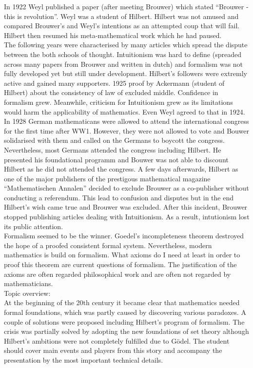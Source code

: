 \documentclass[hidelinks]{article}
\theoremstyle{plain}
\theoremstyle{definition}
\theoremstyle{rem}
\begin{document}
In 1922 Weyl published a paper (after meeting Brouwer) which stated ``Brouwer - this is revolution''. Weyl was a student of Hilbert. Hilbert was not amused and compared Brouwer's and Weyl's intentions as an attempted coup that will fail. Hilbert then resumed his meta-mathematical work which he had paused.\\

The following years were characterised by many articles which spread the dispute between the both schools of thought. Intuitionism was hard to define (spreaded across many papers from Brouwer and written in dutch) and formalism was not fully developed yet but still under development. Hilbert's followers were extremly active and gained many supporters. 1925 proof by Ackermann (student of Hilbert) about the consistency of law of excluded middle. Confidence in formalism grew. Meanwhile, criticism for Intuitionism grew as its limitations would harm the applicability of mathematics. Even Weyl agreed to that in 1924.\\

In 1928 German mathematicans were allowed to attend the international congress for the first time after WW1. However, they were not allowed to vote and Bouwer solidarised with them and called on the Germans to boycott the congress. Nevertheless, most Germans attended the congress including Hilbert. He presented his foundational programm and Bouwer was not able to discount Hilbert as he did not attended the congress. A few days afterwards, Hilbert as one of the major publishers of the prestigous mathematical magazine ``Mathematischen Annalen'' decided to exclude Brouwer as a co-publisher without conducting a referendum. This lead to confusion and disputes but in the end Hilbert's wish came true and Brouwer was excluded. After this incident, Brouwer stopped publishing articles dealing with Intuitionism. As a result, intutionism lost its public attention. \\

Formalism seemed to be the winner. Goedel's incompleteness theorem destroyed the hope of a proofed consistent formal system. Nevertheless, modern mathematics is build on formalism. What axioms do I need at least in order to proof this theorem are current questions of formalism. The justification of the axioms are often regarded philosophical work and are often not regarded by mathematicians.
\\

Topic overview:\\
At the beginning of the 20th century it became clear that mathematics needed formal foundations, which was partly caused by discovering various paradoxes. A couple of solutions were proposed including Hilbert's program of formalism. The crisis was partially solved by adopting the new foundations of set theory although Hilbert's ambitions were not completely fulfilled due to Gödel. The student should cover main events and players from this story and accompany the presentation by the most important technical details.
\end{document}
